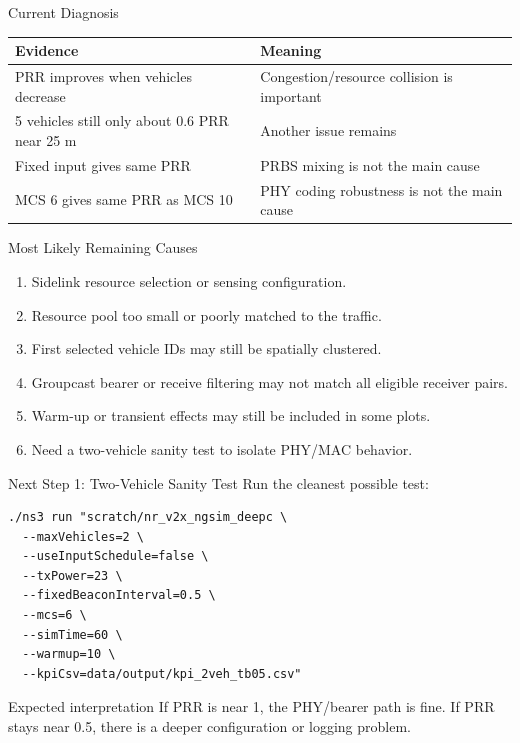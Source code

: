 \documentclass[aspectratio=169,11pt]{beamer}
\begin{document}
\begin{frame}{Current Diagnosis}
\large
\begin{table}
\centering
\renewcommand{\arraystretch}{1.25}
\begin{tabular}{p{5.0cm} p{6.4cm}}
\toprule
\textbf{Evidence} & \textbf{Meaning} \\
\midrule
PRR improves when vehicles decrease & Congestion/resource collision is important \\
5 vehicles still only about 0.6 PRR near 25 m & Another issue remains \\
Fixed input gives same PRR & PRBS mixing is not the main cause \\
MCS 6 gives same PRR as MCS 10 & PHY coding robustness is not the main cause \\
\bottomrule
\end{tabular}
\end{table}
\end{frame}

\begin{frame}{Most Likely Remaining Causes}
\large
\begin{enumerate}
  \item Sidelink resource selection or sensing configuration.
  \item Resource pool too small or poorly matched to the traffic.
  \item First selected vehicle IDs may still be spatially clustered.
  \item Groupcast bearer or receive filtering may not match all eligible receiver pairs.
  \item Warm-up or transient effects may still be included in some plots.
  \item Need a two-vehicle sanity test to isolate PHY/MAC behavior.
\end{enumerate}
\end{frame}

\begin{frame}[fragile]{Next Step 1: Two-Vehicle Sanity Test}
\large
Run the cleanest possible test:

\begin{lstlisting}
./ns3 run "scratch/nr_v2x_ngsim_deepc \
  --maxVehicles=2 \
  --useInputSchedule=false \
  --txPower=23 \
  --fixedBeaconInterval=0.5 \
  --mcs=6 \
  --simTime=60 \
  --warmup=10 \
  --kpiCsv=data/output/kpi_2veh_tb05.csv"
\end{lstlisting}

\vspace{0.2cm}
\begin{block}{Expected interpretation}
If PRR is near 1, the PHY/bearer path is fine. If PRR stays near 0.5, there is a deeper configuration or logging problem.
\end{block}
\end{frame}
\end{document}
